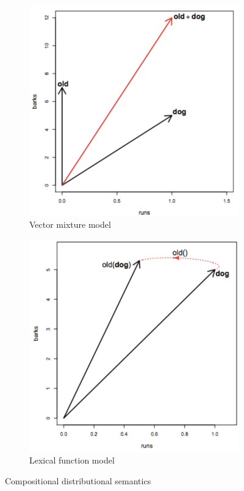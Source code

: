 \begin{figure}[ht]
	\centering
	\begin{subfigure}{0.3\textwidth}
		\includegraphics[width=\textwidth]{figures/compositional_semantic_vector_mixture_model.png}
		\caption{Vector mixture model}
	\end{subfigure}
	\begin{subfigure}{0.3\textwidth}
		\includegraphics[width=\textwidth]{figures/compositional_semantics_lexical_function_models.png}
		\caption{Lexical function model}
	\end{subfigure}
	\caption{Compositional distributional semantics}
	\label{fig:compositional_semantic_vector_mixture_model}
\end{figure}
